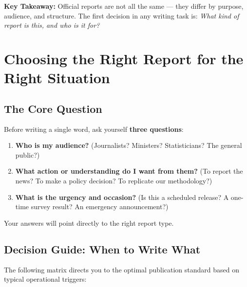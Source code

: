 \documentclass[11pt,a4paper,oneside]{book}
\begin{document}
\begin{tcolorbox}[nsolightbox]
\textbf{Key Takeaway:} Official reports are not all the same --- they differ by purpose, audience, and structure. The first decision in any writing task is: \emph{What kind of report is this, and who is it for?}
\end{tcolorbox}


\chapter{Choosing the Right Report for the Right Situation}

\section{The Core Question}

Before writing a single word, ask yourself \textbf{three questions}:

\begin{enumerate}
    \item \textbf{Who is my audience?} (Journalists? Ministers? Statisticians? The general public?)
    \item \textbf{What action or understanding do I want from them?} (To report the news? To make a policy decision? To replicate our methodology?)
    \item \textbf{What is the urgency and occasion?} (Is this a scheduled release? A one-time survey result? An emergency announcement?)
\end{enumerate}

Your answers will point directly to the right report type.

\section{Decision Guide: When to Write What}

The following matrix directs you to the optimal publication standard based on typical operational triggers:
\end{document}
